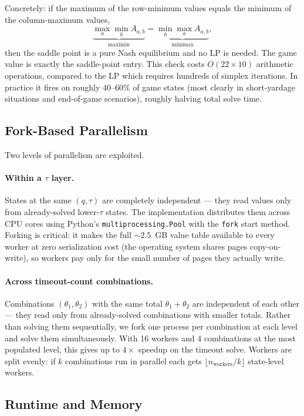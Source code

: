 \documentclass[11pt,letterpaper]{article}
\begin{document}
Concretely: if the maximum of the row-minimum values equals the minimum of the
column-maximum values,
\[
  \underbrace{\max_a \min_b A_{a,b}}_{\text{maximin}} = \underbrace{\min_b \max_a A_{a,b}}_{\text{minimax}},
\]
then the saddle point is a pure Nash equilibrium and no LP is needed.  The game value
is exactly the saddle-point entry.  This check costs $O(22 \times 10)$ arithmetic
operations, compared to the LP which requires hundreds of simplex iterations.  In
practice it fires on roughly 40--60\% of game states (most clearly in short-yardage
situations and end-of-game scenarios), roughly halving total solve time.

\subsection{Fork-Based Parallelism}

Two levels of parallelism are exploited.

\paragraph{Within a $\tau$ layer.}
States at the same $(q, \tau)$ are completely independent --- they read values only
from already-solved lower-$\tau$ states.  The implementation distributes them across
CPU cores using Python's \texttt{multiprocessing.Pool} with the \texttt{fork} start
method.  Forking is critical: it makes the full ${\sim}2.5$~GB value table available to
every worker at zero serialization cost (the operating system shares pages
copy-on-write), so workers pay only for the small number of pages they actually
write.

\paragraph{Across timeout-count combinations.}
Combinations $(\theta_1, \theta_2)$ with the same total $\theta_1 + \theta_2$ are
independent of each other --- they read only from already-solved combinations with
smaller totals.  Rather than solving them sequentially, we fork one process per
combination at each level and solve them simultaneously.  With 16 workers and 4
combinations at the most populated level, this gives up to $4\times$ speedup on the
timeout solve.  Workers are split evenly: if $k$ combinations run in parallel each
gets $\lfloor n_\text{workers}/k \rfloor$ state-level workers.

\subsection{Runtime and Memory}
\end{document}
